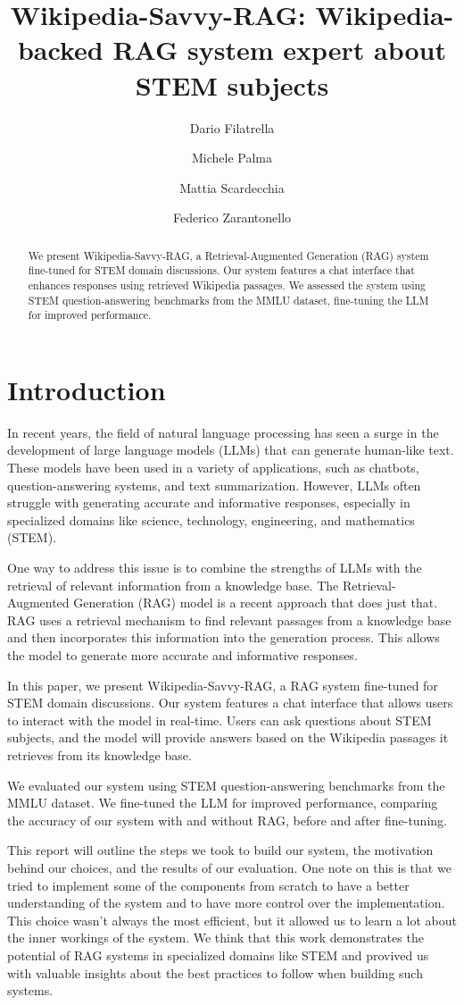 \documentclass[11pt]{article}
\title{Wikipedia-Savvy-RAG: Wikipedia-backed RAG system expert about STEM subjects}
\author{Dario Filatrella \and Michele Palma \and Mattia Scardecchia \and Federico Zarantonello}
\begin{document}
\maketitle
\begin{abstract}
We present Wikipedia-Savvy-RAG, a Retrieval-Augmented Generation (RAG) system 
fine-tuned for STEM domain discussions. Our system features a chat interface that 
enhances responses using retrieved Wikipedia passages.  
We assessed the system using STEM question-answering benchmarks from the MMLU dataset, 
fine-tuning the LLM for improved performance. 

\end{abstract}

\section{Introduction}

In recent years, the field of natural language processing has seen a surge in
the development of large language models (LLMs) that can generate human-like text.
These models have been used in a variety of applications, such as chatbots,
question-answering systems, and text summarization. However, LLMs often struggle
with generating accurate and informative responses, especially in specialized
domains like science, technology, engineering, and mathematics (STEM).

One way to address this issue is to combine the strengths of LLMs with the
retrieval of relevant information from a knowledge base. The Retrieval-Augmented
Generation (RAG) model is a recent approach that does just that. RAG uses a
retrieval mechanism to find relevant passages from a knowledge base and then
incorporates this information into the generation process. This allows the model
to generate more accurate and informative responses.

In this paper, we present Wikipedia-Savvy-RAG, a RAG system fine-tuned for STEM
domain discussions. Our system features a chat interface that allows users to
interact with the model in real-time. Users can ask questions about STEM
subjects, and the model will provide answers based on the Wikipedia passages it
retrieves from its knowledge base. 

We evaluated our system using STEM question-answering benchmarks from the MMLU
dataset. We fine-tuned the LLM for improved performance, comparing the accuracy
of our system with and without RAG, before and after fine-tuning.

This report will outline the steps we took to build our system, the motivation
behind our choices, and the results of our evaluation. 
One note on this is that we tried to implement some of the components from scratch
to have a better understanding of the system and to have more control over the
implementation.
This choice wasn't always the most efficient, but it allowed us to learn a lot
about the inner workings of the system. 
We think that this work demonstrates the potential of RAG systems in specialized 
domains like STEM and provived us with valuable insights about the best practices 
to follow when building such systems.
\end{document}

